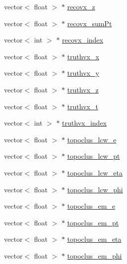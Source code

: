 \begin{DoxyCompactItemize}
\item 
vector$<$ float $>$ $\ast$ \hyperlink{classCollectionTree_aca060438f3f67428d1732305e3a05838}{recovx\+\_\+z}
\item 
vector$<$ float $>$ $\ast$ \hyperlink{classCollectionTree_ab80a3fb4e543eac362b072f7f63fe0a7}{recovx\+\_\+sum\+Pt}
\item 
vector$<$ int $>$ $\ast$ \hyperlink{classCollectionTree_a237515b1bac96528f3fafc3bcf8333a6}{recovx\+\_\+index}
\item 
vector$<$ float $>$ $\ast$ \hyperlink{classCollectionTree_a441f50784e13bb30c46cf9c09ef918ea}{truthvx\+\_\+x}
\item 
vector$<$ float $>$ $\ast$ \hyperlink{classCollectionTree_a8f534408aaa08cb92ee7fd262aa6d8ed}{truthvx\+\_\+y}
\item 
vector$<$ float $>$ $\ast$ \hyperlink{classCollectionTree_ab77a3862131cd39d5b6f53cba02fde55}{truthvx\+\_\+z}
\item 
vector$<$ float $>$ $\ast$ \hyperlink{classCollectionTree_a7df673800f59dfc9141ba37dad54219a}{truthvx\+\_\+t}
\item 
vector$<$ int $>$ $\ast$ \hyperlink{classCollectionTree_a0011244226cf8117ab657975277942dc}{truthvx\+\_\+index}
\item 
vector$<$ float $>$ $\ast$ \hyperlink{classCollectionTree_ae035b4b2617fe4e28ca7b15cf65bd7b4}{topoclus\+\_\+lcw\+\_\+e}
\item 
vector$<$ float $>$ $\ast$ \hyperlink{classCollectionTree_a359af1c57bfec1ff4d56223137bda654}{topoclus\+\_\+lcw\+\_\+pt}
\item 
vector$<$ float $>$ $\ast$ \hyperlink{classCollectionTree_a1220ed2aa9e0d8966ed85c5a47760532}{topoclus\+\_\+lcw\+\_\+eta}
\item 
vector$<$ float $>$ $\ast$ \hyperlink{classCollectionTree_a2808d68f1fabf870c7840b3eaf9f82c6}{topoclus\+\_\+lcw\+\_\+phi}
\item 
vector$<$ float $>$ $\ast$ \hyperlink{classCollectionTree_ab2b8944c9eddb2281d86b2b1abad4dfe}{topoclus\+\_\+em\+\_\+e}
\item 
vector$<$ float $>$ $\ast$ \hyperlink{classCollectionTree_a0e1b97f641e3512d30aa791464030133}{topoclus\+\_\+em\+\_\+pt}
\item 
vector$<$ float $>$ $\ast$ \hyperlink{classCollectionTree_a1597254d598952b2ae77ef42a6c10afa}{topoclus\+\_\+em\+\_\+eta}
\item 
vector$<$ float $>$ $\ast$ \hyperlink{classCollectionTree_ab376a159c40b012180d14838cc63cb99}{topoclus\+\_\+em\+\_\+phi}
\item 

\end{DoxyCompactItemize}
